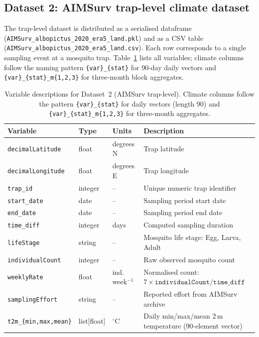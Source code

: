 \documentclass[11pt]{article}
\begin{document}
\subsection*{Dataset 2: AIMSurv trap-level climate dataset}

The trap-level dataset is distributed as a serialised dataframe 
(\texttt{AIMSurv\_albopictus\_2020\_era5\_land.pkl}) and as a CSV 
table (\texttt{AIMSurv\_albopictus\_2020\_era5\_land.csv}). Each row corresponds to a single sampling 
event at a mosquito trap. Table~\ref{tab:vars_aimsurv} lists all 
variables; climate columns follow the naming pattern 
\texttt{\{var\}\_\{stat\}} for 90-day daily vectors and 
\texttt{\{var\}\_\{stat\}\_m\{1,2,3\}} for three-month block aggregates.

\begin{table}[htbp]
\caption{Variable descriptions for Dataset~2 (AIMSurv trap-level). 
Climate columns follow the pattern \texttt{\{var\}\_\{stat\}} for daily 
vectors (length 90) and \texttt{\{var\}\_\{stat\}\_m\{1,2,3\}} for 
three-month aggregates.}
\label{tab:vars_aimsurv}
\small
\setlength{\tabcolsep}{4pt}
\begin{tabular}{p{5.5cm}p{2.0cm}p{2.2cm}p{4.6cm}}
\hline
Variable & Type & Units & Description \\
\hline
\texttt{decimalLatitude} & float & degrees\,N & Trap latitude \\
\texttt{decimalLongitude} & float & degrees\,E & Trap longitude \\
\texttt{trap\_id} & integer & -- & Unique numeric trap identifier \\
\texttt{start\_date} & date & -- & Sampling period start date \\
\texttt{end\_date} & date & -- & Sampling period end date \\
\texttt{time\_diff} & integer & days & Computed sampling duration \\
\texttt{lifeStage} & string & -- & Mosquito life stage: Egg, Larva, Adult \\
\texttt{individualCount} & integer & -- & Raw observed mosquito count \\
\texttt{weeklyRate} & float & ind.\,week$^{-1}$ & 
  Normalised count: $7 \times \texttt{individualCount} / \texttt{time\_diff}$ \\
\texttt{samplingEffort} & string & -- & Reported effort from AIMSurv archive \\
\texttt{t2m\_\{min,max,mean\}} & list[float] & $^{\circ}$C & 
  Daily min/max/mean 2\,m temperature (90-element vector) \\

\end{tabular}
\end{table}
\end{document}
